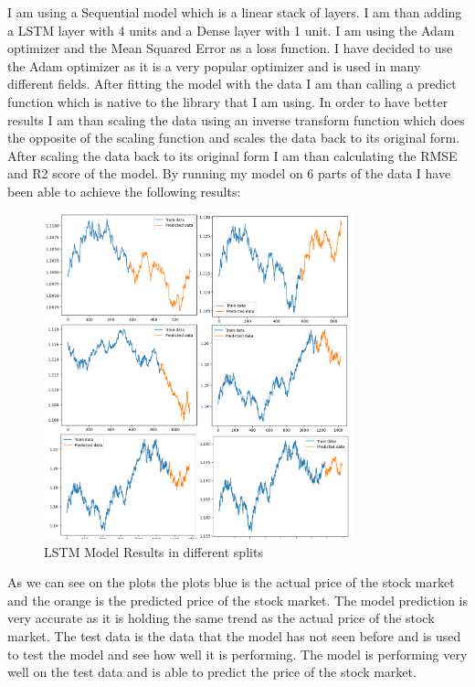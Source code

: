 \documentclass{imc-inf}
\begin{document}
		
			I am using a Sequential model which is a linear stack of layers. I am than adding a LSTM
			layer with 4 units and a Dense layer with 1 unit. I am using the Adam optimizer and the Mean Squared Error as a loss function.
			I have decided to use the Adam optimizer as it is a very popular optimizer and is used in many different fields. After fitting the model with the data I am than calling a predict function which is native to the library 
			that I am using. In order to have better results I am than scaling the data using an inverse transform function which does the opposite of the scaling function and scales the data back to its original form. 
			After scaling the data back to its original form I am than calculating the RMSE and R2 score of the model. 
			By running my model on 6 parts of the data I have been able to achieve the following results:			
			\begin{figure}
				\centering
				\includegraphics[width=0.8\textwidth]{lstm_chart.png}
				\caption{LSTM Model Results in different splits}
				\label{fig:lstm_model_plots}
			\end{figure}
			As we can see on the plots the plots blue is the actual price of the stock market and the orange is the predicted price of the stock market. The model prediction is very accurate as it is holding the same trend as the actual price
			of the stock market. The test data is the data that the model has not seen before and is used to test the model and see how well it is performing. The model is performing very well on the test data and is able to predict the price of the stock market.
\end{document}

